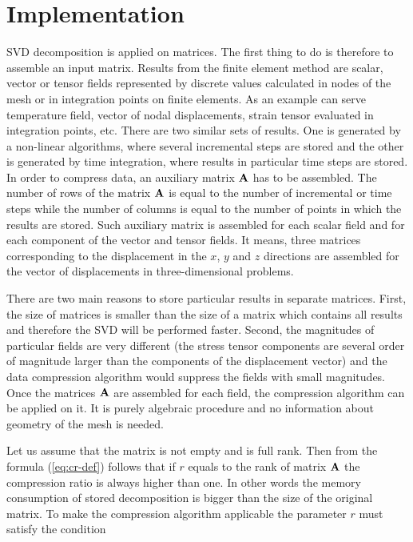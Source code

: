 
\section{Implementation}

SVD decomposition is applied on matrices. The first thing to do is therefore to assemble an input matrix. Results from the finite element method are scalar, vector or tensor fields represented by discrete values calculated in nodes of the mesh or in integration points on finite elements. As an example can serve temperature field, vector of nodal displacements, strain tensor evaluated in integration points, etc. There are two similar sets of results. One is generated by a non-linear algorithms, where several incremental steps are stored and the other is generated by time integration, where results in particular time steps are stored. In order to compress data, an auxiliary matrix $\mathbf{A}$ has to be assembled. The number of rows of the matrix $\mathbf{A}$ is equal to the number of incremental or time steps while the number of columns is equal to the number of points in which the results are stored. Such auxiliary matrix is assembled for each scalar field and for each component of the vector and tensor fields. It means, three matrices corresponding to the displacement in the $x$, $y$ and $z$ directions are assembled for the vector of displacements in three-dimensional problems.

There are two main reasons to store particular results in separate matrices. First, the size of matrices is smaller than the size of a matrix which contains all results and therefore the SVD will be performed faster. Second, the magnitudes of particular fields are very different (the stress tensor components are several order of magnitude larger than the components of the displacement vector) and the data compression algorithm would suppress the fields with small magnitudes. Once the matrices $\mathbf{A}$ are assembled for each field, the compression algorithm can be applied on it. It is purely algebraic procedure and no information about geometry of the mesh is needed.

Let us assume that the matrix is not empty and is full rank. Then from the formula (\ref{eq:cr-def}) follows that if $r$ equals to the rank of matrix $\mathbf{A}$ the compression ratio is always higher than one. In other words the memory consumption of stored decomposition is bigger than the size of the original matrix. To make the compression algorithm applicable the parameter $r$ must satisfy the condition

